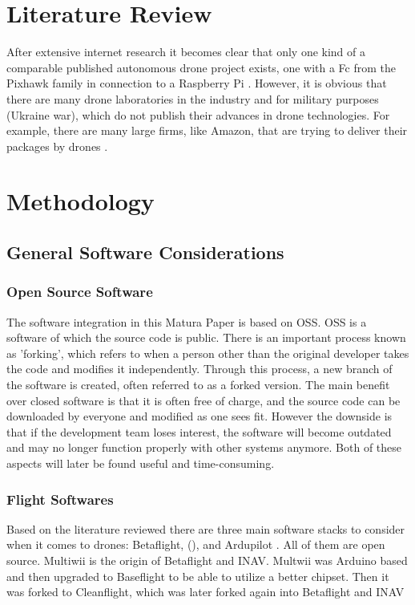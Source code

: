 \documentclass[svgnames]{article}
\begin{document}
	\section{Literature Review}\label{literaturereview}
	After extensive internet research it becomes clear that only one kind of a comparable published autonomous drone project exists, one with a \gls{Fc} from the Pixhawk family in connection to a Raspberry Pi \cite{litpixall, litpixgir, litpixins}. However, it is obvious that there are many drone laboratories in the industry and for military purposes (Ukraine war), which do not publish their advances in drone technologies. For example, there are many large firms, like Amazon, that are trying to deliver their packages by drones \cite{amazondrone}.
	
	\newpage
	\section{Methodology}
	\subsection{General Software Considerations}

	\subsubsection{Open Source Software}
	The software integration in this Matura Paper is based on \gls{OSS}. \gls{OSS} is a software of which the source code is public. There is an important process known as 'forking', which refers to when a person other than the original developer takes the code and modifies it independently. Through this process, a new branch of the software is created, often referred to as a forked version. The main benefit over closed software is that it is often free of charge, and the source code can be downloaded by everyone and modified as one sees fit. However the downside is that if the development team loses interest, the software will become outdated and may no longer function properly with other systems anymore. Both of these aspects will later be found useful and time-consuming. 
	
	\subsubsection{Flight Softwares}
	Based on the literature reviewed there are three main software stacks to consider when it comes to drones: Betaflight, \myinav (), and Ardupilot  \cite{history}. All of them are open source. Multiwii is the origin of Betaflight and \gls{INAV}. Multwii was Arduino based and then upgraded to Baseflight to be able to utilize a better chipset. Then it was forked to Cleanflight, which was later forked again into Betaflight and \gls{INAV}
	
\end{document}
